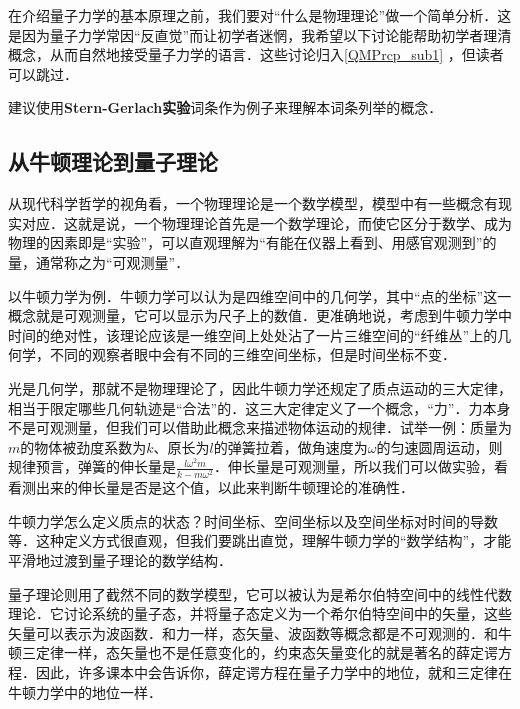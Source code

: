 

在介绍量子力学的基本原理之前，我们要对“什么是物理理论”做一个简单分析．这是因为量子力学常因“反直觉”而让初学者迷惘，我希望以下讨论能帮助初学者理清概念，从而自然地接受量子力学的语言．这些讨论归入\autoref{QMPrcp_sub1} ，但读者可以跳过．

建议使用\textbf{Stern-Gerlach实验}词条作为例子来理解本词条列举的概念．

\subsection{从牛顿理论到量子理论}\label{QMPrcp_sub1}

从现代科学哲学的视角看，一个物理理论是一个数学模型，模型中有一些概念有现实对应．这就是说，一个物理理论首先是一个数学理论，而使它区分于数学、成为物理的因素即是“实验”，可以直观理解为“有能在仪器上看到、用感官观测到”的量，通常称之为“可观测量”．

以牛顿力学为例．牛顿力学可以认为是四维空间中的几何学，其中“点的坐标”这一概念就是可观测量，它可以显示为尺子上的数值．更准确地说，考虑到牛顿力学中时间的绝对性，该理论应该是一维空间上处处沾了一片三维空间的“纤维丛”上的几何学，不同的观察者眼中会有不同的三维空间坐标，但是时间坐标不变．

光是几何学，那就不是物理理论了，因此牛顿力学还规定了质点运动的三大定律，相当于限定哪些几何轨迹是“合法”的．这三大定律定义了一个概念，“力”．力本身不是可观测量，但我们可以借助此概念来描述物体运动的规律．试举一例：质量为$m$的物体被劲度系数为$k$、原长为$l$的弹簧拉着，做角速度为$\omega$的匀速圆周运动，则规律预言，弹簧的伸长量是$\frac{l\omega^2m}{k-m\omega^2}$．伸长量是可观测量，所以我们可以做实验，看看测出来的伸长量是否是这个值，以此来判断牛顿理论的准确性．

牛顿力学怎么定义质点的状态？时间坐标、空间坐标以及空间坐标对时间的导数等．这种定义方式很直观，但我们要跳出直觉，理解牛顿力学的“数学结构”，才能平滑地过渡到量子理论的数学结构．

量子理论则用了截然不同的数学模型，它可以被认为是希尔伯特空间中的线性代数理论．它讨论系统的量子态，并将量子态定义为一个希尔伯特空间中的矢量，这些矢量可以表示为波函数．和力一样，态矢量、波函数等概念都是不可观测的．和牛顿三定律一样，态矢量也不是任意变化的，约束态矢量变化的就是著名的薛定谔方程．因此，许多课本中会告诉你，薛定谔方程在量子力学中的地位，就和三定律在牛顿力学中的地位一样．

